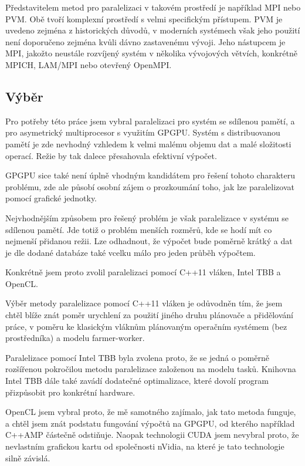 \documentclass[]{thesiskiv}
\begin{document}
Představitelem metod pro paralelizaci v takovém prostředí je například MPI nebo PVM. Obě tvoří komplexní prostředí s velmi specifickým přístupem. PVM je uvedeno zejména z historických důvodů, v moderních systémech však jeho použití není doporučeno zejména kvůli dávno zastavenému vývoji. Jeho nástupcem je MPI, jakožto neustále rozvíjený systém v několika vývojových větvích, konkrétně MPICH, LAM/MPI nebo otevřený OpenMPI.

\subsection{Výběr}

Pro potřeby této práce jsem vybral paralelizaci pro systém se sdílenou pamětí, a pro asymetrický multiprocesor s využitím GPGPU. Systém s distribuovanou pamětí je zde nevhodný vzhledem k velmi malému objemu dat a malé složitosti operací. Režie by tak dalece přesahovala efektivní výpočet.

GPGPU sice také není úplně vhodným kandidátem pro řešení tohoto charakteru problému, zde ale působí osobní zájem o prozkoumání toho, jak lze paralelizovat pomocí grafické jednotky.

Nejvhodnějším způsobem pro řešený problém je však paralelizace v systému se sdílenou pamětí. Jde totiž o problém menších rozměrů, kde se hodí mít co nejmenší přidanou režii. Lze odhadnout, že výpočet bude poměrně krátký a dat je dle dodané databáze také vcelku málo pro jeden průběh výpočtem.

Konkrétně jsem proto zvolil paralelizaci pomocí C++11 vláken, Intel TBB a OpenCL.

Výběr metody paralelizace pomocí C++11 vláken je odůvodněn tím, že jsem chtěl blíže znát poměr urychlení za použití jiného druhu plánovače a přidělování práce, v poměru ke klasickým vláknům plánovaným operačním systémem (bez prostředníka) a modelu farmer-worker.

Paralelizace pomocí Intel TBB byla zvolena proto, že se jedná o poměrně rozšířenou pokročilou metodu paralelizace založenou na modelu tasků. Knihovna Intel TBB dále také zavádí dodatečné optimalizace, které dovolí program přizpůsobit pro konkrétní hardware.

OpenCL jsem vybral proto, že mě samotného zajímalo, jak tato metoda funguje, a chtěl jsem znát podstatu fungování výpočtů na GPGPU, od kterého například C++AMP částečně odstiňuje. Naopak technologii CUDA jsem nevybral proto, že nevlastním grafickou kartu od společnosti nVidia, na které je tato technologie silně závislá.
\end{document}
